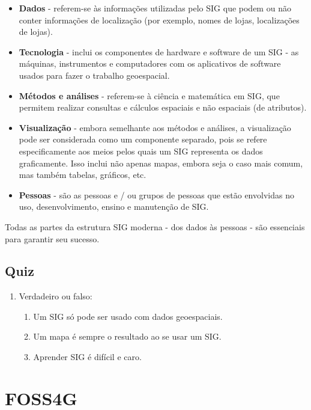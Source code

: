\documentclass[
]{krantz}
\providecommand{\tightlist}{%
  \setlength{\itemsep}{0pt}\setlength{\parskip}{0pt}}
\begin{document}
\begin{itemize}
\tightlist
\item
  \textbf{Dados} - referem-se às informações utilizadas pelo SIG que podem ou não conter informações de localização (por exemplo, nomes de lojas, localizações de lojas).
\item
  \textbf{Tecnologia} - inclui os componentes de hardware e software de um SIG - as máquinas, instrumentos e computadores com os aplicativos de software usados para fazer o trabalho geoespacial.
\item
  \textbf{Métodos e análises} - referem-se à ciência e matemática em SIG, que permitem realizar consultas e cálculos espaciais e não espaciais (de atributos).
\item
  \textbf{Visualização} - embora semelhante aos métodos e análises, a visualização pode ser considerada como um componente separado, pois se refere especificamente aos meios pelos quais um SIG representa os dados graficamente. Isso inclui não apenas mapas, embora seja o caso mais comum, mas também tabelas, gráficos, etc.
\item
  \textbf{Pessoas} - são as pessoas e / ou grupos de pessoas que estão envolvidas no uso, desenvolvimento, ensino e manutenção de SIG.
\end{itemize}

Todas as partes da estrutura SIG moderna - dos dados às pessoas - são essenciais para garantir seu sucesso.

\hypertarget{quiz-2}{%
\subsection{Quiz}\label{quiz-2}}

\begin{enumerate}
\def\labelenumi{\arabic{enumi}.}
\tightlist
\item
  Verdadeiro ou falso:

  \begin{enumerate}
  \def\labelenumii{\arabic{enumii}.}
  \tightlist
  \item
    Um SIG só pode ser usado com dados geoespaciais.
  \item
    Um mapa é sempre o resultado ao se usar um SIG.
  \item
    Aprender SIG é difícil e caro.
  \end{enumerate}
\end{enumerate}

\hypertarget{foss4g}{%
\section{FOSS4G}\label{foss4g}}
\end{document}
